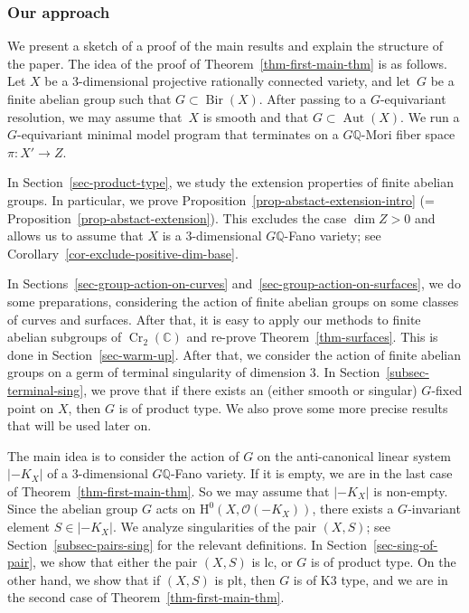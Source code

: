 \documentclass[11pt]{amsart}
\numberwithin{equation}{section}
\theoremstyle{definition}
\theoremstyle{remark}
\newcommand{\OOO}{\mathscr{O}}
\DeclareMathOperator{\Cr}{Cr}
\DeclareMathOperator{\Aut}{Aut}
\DeclareMathOperator{\Bir}{Bir}
\begin{document}
\subsubsection*{Our approach} We present a sketch of a proof of the main results and explain the structure of the paper.  The idea of the proof of Theorem~\ref{thm-first-main-thm} is as follows.  Let $X$ be a $3$-dimensional projective rationally connected variety, and let~$G$ be a finite abelian group such that $G\subset \Bir(X)$. After passing to a $G$-equivariant resolution, we may assume that~$X$ is smooth and that $G\subset \Aut(X)$. We run a $G$-equivariant minimal model program that terminates on a $G\mathbb{Q}$-Mori fiber space $\pi\colon X'\to Z$.

In Section~\ref{sec-product-type}, we study the extension properties of finite abelian groups. In particular, we prove Proposition~\ref{prop-abstact-extension-intro} (= Proposition~\ref{prop-abstact-extension}). This excludes the case $\dim Z>0$ and allows us to assume that $X$ is a $3$-dimensional $G\mathbb{Q}$-Fano variety; see Corollary~\ref{cor-exclude-positive-dim-base}.

In Sections~\ref{sec-group-action-on-curves} and~\ref{sec-group-action-on-surfaces}, we do some preparations, considering the action of finite abelian groups on some classes of curves and surfaces. After that, it is easy to apply our methods to finite abelian subgroups of $\Cr_2(\mathbb{C})$ and re-prove Theorem~\ref{thm-surfaces}. This is done in Section~\ref{sec-warm-up}. After that, we consider the action of finite abelian groups on a germ of terminal singularity of dimension $3$. In Section~\ref{subsec-terminal-sing}, we prove that if there exists an (either smooth or singular) $G$-fixed point on $X$, then $G$ is of product type. We also prove some more precise results that will be used later on.

The main idea is to consider the action of $G$ on the anti-canonical linear system $|-K_X|$ of a $3$-dimensional $G\mathbb{Q}$-Fano variety.  If it is empty, we are in the last case of Theorem~\ref{thm-first-main-thm}. So we may assume that $|-K_X|$ is non-empty. Since the abelian group $G$ acts on $\mathrm{H}^0(X, \OOO(-K_X))$, there exists a $G$-invariant element $S\in |-K_X|$. We analyze singularities of the pair $(X, S)$; see Section~\ref{subsec-pairs-sing} for the relevant definitions. In Section~\ref{sec-sing-of-pair}, we show that either the pair $(X, S)$ is lc, or $G$ is of product type. On the other hand, we show that if $(X, S)$ is plt, then $G$ is of K3 type, and we are in the second case of Theorem~\ref{thm-first-main-thm}.
\end{document}
